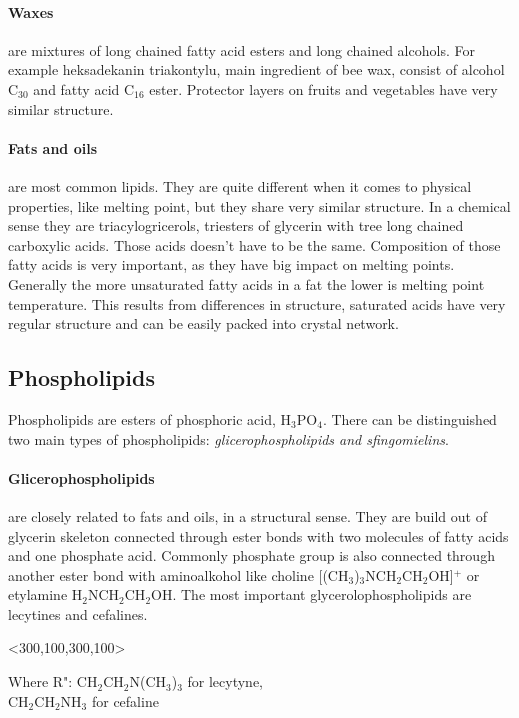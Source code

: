 \documentclass{article}
\begin{document}
\paragraph{Waxes}
are mixtures of long chained fatty acid esters and long chained alcohols. For
example heksadekanin triakontylu, main ingredient of bee wax, consist of alcohol
C$_{30}$ and fatty acid C$_{16}$ ester. Protector layers on fruits and vegetables have
very similar structure.

\paragraph{Fats and oils} are most common lipids. They are quite different when it
comes to physical properties, like melting point, but they share very similar
structure. In a chemical sense they are triacylogricerols, triesters of glycerin
with tree long chained carboxylic acids. Those acids doesn't have to be the same.
Composition of those fatty acids is very important, as they have big impact on
melting points. Generally the more unsaturated fatty acids in a fat the lower is
melting point temperature. This results from differences in structure, saturated
acids have very regular structure and can be easily packed into crystal network.

\subsection{Phospholipids}
Phospholipids are esters of phosphoric acid, H$_3$PO$_4$. There can be distinguished
two main types of phospholipids: \textit{glicerophospholipids and sfingomielins}.
\paragraph{Glicerophospholipids} are closely related to fats and oils, in a
structural sense. They are build out of glycerin skeleton connected through ester
bonds with two molecules of fatty acids and one phosphate acid. Commonly phosphate
group is also connected through another ester bond with aminoalkohol
like choline [(CH$_3$)$_3$NCH$_2$CH$_2$OH]$^+$ or etylamine H$_2$NCH$_2$CH$_2$OH. The
most important glycerolophospholipids are lecytines and cefalines. 

\vspace{5mm}
<300,100,300,100>
\vspace{5mm}
\begin{flushright}
Where R": CH$_2$CH$_2$N(CH$_3$)$_3$ for lecytyne,\\
CH$_2$CH$_2$NH$_3$ for cefaline\\
\end{flushright}
\end{document}

